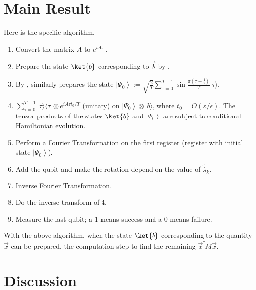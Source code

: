 \documentclass[b5paper,papersize,dvipdfmx,fleqn]{article}
\begin{document}
\section{Main Result}

Here is the specific algorithm.
\begin{enumerate}
  \item Convert the matrix $A$ to $e^{iAt}$ \cite{Berry2007}.
  \item Prepare the state $\ket{b}$ corresponding to $\vec{b}$ by \cite{Grover2002}.
  \item By \cite{Grover2002}, similarly prepares the state $\displaystyle \left|\Psi_{0}\right\rangle:=\sqrt{\frac{2}{T}}\sum_{\tau=0}^{T-1}\sin \frac{\pi\left(\tau+\frac{1}{2}\right)}{T}|\tau\rangle$.
  \item $\displaystyle \sum_{\tau=0}^{T-1}|\tau\rangle\langle\tau| \otimes e^{i A \tau t_{0} / T}$ (unitary) on $\left|\Psi_{0}\right\rangle \otimes|b\rangle$, where $t_{0}=O(\kappa / \epsilon)$. The tensor products of the states $\ket{b}$ and $\left|\Psi_{0}\right\rangle$ are subject to conditional Hamiltonian evolution.
\item  Perform a Fourier Transformation on the first register (register with initial state $\left|\Psi_{0}\right\rangle$).
  \item Add the qubit and make the rotation depend on the value of $\tilde{\lambda}_{k}$.
  \item Inverse Fourier Transformation.
  \item Do the inverse transform of 4.
  \item Measure the last qubit; a 1 means success and a 0 means failure.
\end{enumerate}
With the above algorithm, when the state $\ket{b}$ corresponding to the quantity $\vec{x}$ can be prepared, the computation step to find the remaining $\vec{x}^\dagger M\vec{x}$.



\section{Discussion}
\end{document}
